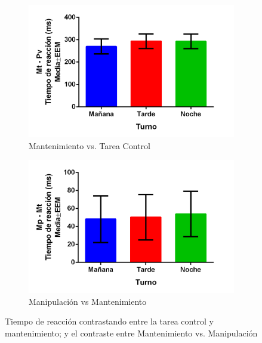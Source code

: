 \documentclass[12pt,letterpaper,final]{article}
\begin{document}
\begin{figure}[h]
 \begin{footnotesize}
  \begin{subfigure}[a]{.4\textwidth}	
	\centering
	\includegraphics[scale=0.6]{graficas/MtPv.png}
	\caption{Mantenimiento vs. Tarea Control}
	\label{Sub:MtPv}
	\end{subfigure}
    \hfill
    \begin{subfigure}[a]{\textwidth}	
	\centering
	\includegraphics[scale=0.6]{graficas/MpMt.png}
	\caption{Manipulación vs Mantenimiento}
	\label{Sub:MpMt}
	\end{subfigure}
	
 \end{footnotesize}
	\caption{Tiempo de reacción contrastando entre la tarea control y mantenimiento; y el contraste entre Mantenimiento vs. Manipulación }
	\label{fig:pv}
\end{figure}
\clearpage
\newpage 
\end{document}
